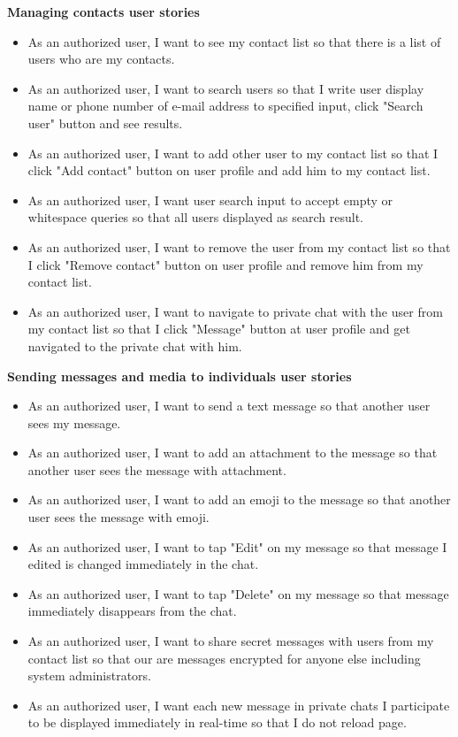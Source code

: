 \textbf{Managing contacts user stories}
\begin{itemize}
    \item As an authorized user, I want to see my contact list so that there is a list of users who are my contacts.
    \item As an authorized user, I want to search users so that I write user display name or phone number of e-mail
    address to specified input, click "Search user" button and see results.
    \item As an authorized user, I want to add other user to my contact list so that I click "Add contact" button on
    user profile and add him to my contact list.
    \item As an authorized user, I want user search input to accept empty or whitespace queries so that all users
    displayed as search result.
    \item As an authorized user, I want to remove the user from my contact list so that I click "Remove contact" button
    on user profile and remove him from my contact list.
    \item As an authorized user, I want to navigate to private chat with the user from my contact list so that I click
    "Message" button at user profile and get navigated to the private chat with him.
\end{itemize}

\textbf{Sending messages and media to individuals user stories}
\begin{itemize}
    \item As an authorized user, I want to send a text message so that another user sees my message.
    \item As an authorized user, I want to add an attachment to the message so that another user sees the message with attachment.
    \item As an authorized user, I want to add an emoji to the message so that another user sees the message with emoji.
    \item As an authorized user, I want to tap "Edit" on my message so that message I edited is changed immediately in the chat.
    \item As an authorized user, I want to tap "Delete" on my message so that message immediately disappears from the chat.
    \item As an authorized user, I want to share secret messages with users from my contact list so that our are
    messages encrypted for anyone else including system administrators.
    \item As an authorized user, I want each new message in private chats I participate to be displayed immediately
    in real-time so that I do not reload page.
\end{itemize}

